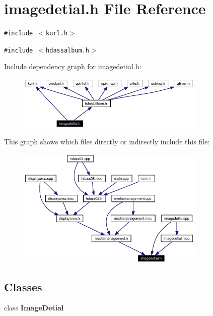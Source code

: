 \section{imagedetial.h File Reference}
\label{imagedetial_8h}


{\tt \#include $<$kurl.h$>$}\par
{\tt \#include $<$hdassalbum.h$>$}\par


Include dependency graph for imagedetial.h:\begin{figure}[H]
\begin{center}
\leavevmode
\includegraphics[width=253pt]{imagedetial_8h__incl}
\end{center}
\end{figure}


This graph shows which files directly or indirectly include this file:\begin{figure}[H]
\begin{center}
\leavevmode
\includegraphics[width=253pt]{imagedetial_8h__dep__incl}
\end{center}
\end{figure}
\subsection*{Classes}
\begin{CompactItemize}
\item 
class {\bf Image\-Detial}
\end{CompactItemize}
